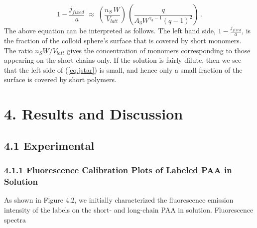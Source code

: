 \documentclass[journal=mamobx,manuscript=article]{achemso}
\begin{document}


\begin{equation}
    \label{eq.jstar}
     1-\frac{j_{fixed}}{a}     \; \approx   \; 
        \left(  \frac{n_S\,W}{V_{latt} }\right) \,\left(   \frac{q}{A_3W^{\gamma_3-1}(q-1)^2}\right)  \,.
\end{equation}
The above equation can be interpreted as follows.  The left hand side, $1-\frac{j_{fixed}}{a}$, is the fraction of the colloid sphere's surface that is covered by short monomers.  The ratio $n_SW/V_{latt}$ gives
the concentration of monomers corresponding to those appearing on the short chains only.
If the solution is fairly dilute, then we see that the left side of (\ref{eq.jstar}) is small,
and hence only a small fraction of the surface is covered by short polymers.



\section{4. Results and Discussion}

\subsection{4.1 Experimental}

\subsubsection{4.1.1 Fluorescence Calibration Plots of Labeled PAA in Solution}

As shown in Figure 4.2, we initially characterized the fluorescence emission intensity of the labels on the short- and long-chain PAA in solution.  Fluorescence spectra
\end{document}
